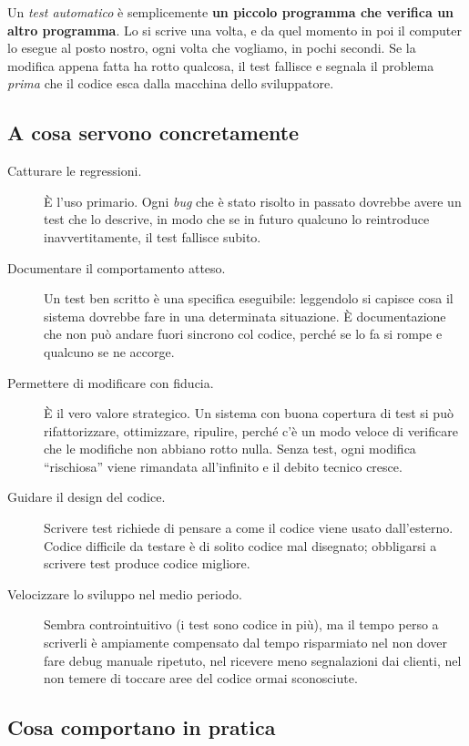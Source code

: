 Un \emph{test automatico} è semplicemente \textbf{un piccolo programma che verifica un altro programma}. Lo si scrive una volta, e da quel momento in poi il computer lo esegue al posto nostro, ogni volta che vogliamo, in pochi secondi. Se la modifica appena fatta ha rotto qualcosa, il test fallisce e segnala il problema \emph{prima} che il codice esca dalla macchina dello sviluppatore.

\subsection{A cosa servono concretamente}

\begin{description}
    \item[Catturare le regressioni.] È l'uso primario. Ogni \emph{bug} che è stato risolto in passato dovrebbe avere un test che lo descrive, in modo che se in futuro qualcuno lo reintroduce inavvertitamente, il test fallisce subito.
    \item[Documentare il comportamento atteso.] Un test ben scritto è una specifica eseguibile: leggendolo si capisce cosa il sistema dovrebbe fare in una determinata situazione. È documentazione che non può andare fuori sincrono col codice, perché se lo fa si rompe e qualcuno se ne accorge.
    \item[Permettere di modificare con fiducia.] È il vero valore strategico. Un sistema con buona copertura di test si può rifattorizzare, ottimizzare, ripulire, perché c'è un modo veloce di verificare che le modifiche non abbiano rotto nulla. Senza test, ogni modifica ``rischiosa'' viene rimandata all'infinito e il debito tecnico cresce.
    \item[Guidare il design del codice.] Scrivere test richiede di pensare a come il codice viene usato dall'esterno. Codice difficile da testare è di solito codice mal disegnato; obbligarsi a scrivere test produce codice migliore.
    \item[Velocizzare lo sviluppo nel medio periodo.] Sembra controintuitivo (i test sono codice in più), ma il tempo perso a scriverli è ampiamente compensato dal tempo risparmiato nel non dover fare debug manuale ripetuto, nel ricevere meno segnalazioni dai clienti, nel non temere di toccare aree del codice ormai sconosciute.
\end{description}

\subsection{Cosa comportano in pratica}

